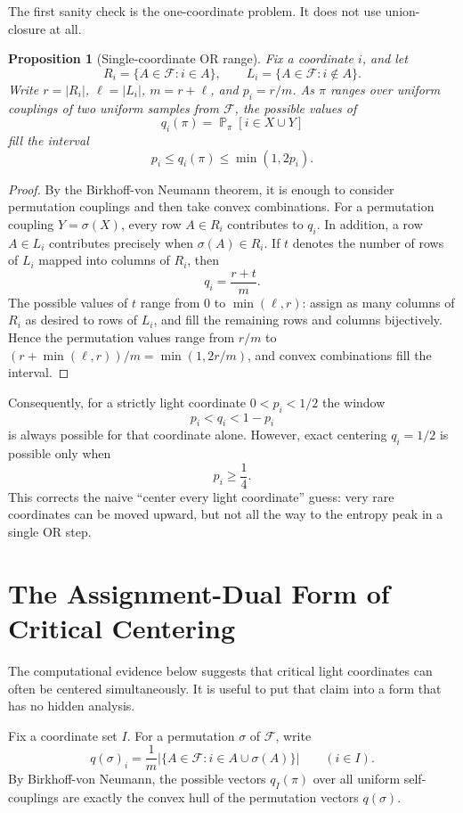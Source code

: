 \documentclass[11pt]{article}
\newtheorem{proposition}{Proposition}
\DeclareMathOperator{\Prb}{\mathbb{P}}
\begin{document}
The first sanity check is the one-coordinate problem.  It does not use
union-closure at all.

\begin{proposition}[Single-coordinate OR range]
Fix a coordinate $i$, and let
\[
  R_i=\{A\in\mathcal{F}:i\in A\},\qquad
  L_i=\{A\in\mathcal{F}:i\notin A\}.
\]
Write $r=|R_i|$, $\ell=|L_i|$, $m=r+\ell$, and $p_i=r/m$.  As $\pi$ ranges
over uniform couplings of two uniform samples from $\mathcal{F}$, the possible
values of
\[
  q_i(\pi)=\Prb_\pi[i\in X\cup Y]
\]
fill the interval
\[
  p_i \le q_i(\pi)\le \min(1,2p_i).
\]
\end{proposition}

\begin{proof}
By the Birkhoff-von Neumann theorem, it is enough to consider permutation
couplings and then take convex combinations.  For a permutation coupling
$Y=\sigma(X)$, every row $A\in R_i$ contributes to $q_i$.  In addition, a row
$A\in L_i$ contributes precisely when $\sigma(A)\in R_i$.  If $t$ denotes the
number of rows of $L_i$ mapped into columns of $R_i$, then
\[
  q_i=\frac{r+t}{m}.
\]
The possible values of $t$ range from $0$ to $\min(\ell,r)$: assign as many
columns of $R_i$ as desired to rows of $L_i$, and fill the remaining rows and
columns bijectively.  Hence the permutation values range from $r/m$ to
$(r+\min(\ell,r))/m=\min(1,2r/m)$, and convex combinations fill the interval.
\end{proof}

Consequently, for a strictly light coordinate $0<p_i<1/2$ the window
\[
  p_i<q_i<1-p_i
\]
is always possible for that coordinate alone.  However, exact centering
$q_i=1/2$ is possible only when
\[
  p_i\ge \frac14.
\]
This corrects the naive ``center every light coordinate'' guess: very rare
coordinates can be moved upward, but not all the way to the entropy peak in a
single OR step.

\section{The Assignment-Dual Form of Critical Centering}

The computational evidence below suggests that critical light coordinates can
often be centered simultaneously.  It is useful to put that claim into a form
that has no hidden analysis.

Fix a coordinate set $I$.  For a permutation $\sigma$ of $\mathcal{F}$, write
\[
  q(\sigma)_i
  =
  \frac1m
  \left|\{A\in\mathcal{F}:i\in A\cup\sigma(A)\}\right|
  \qquad (i\in I).
\]
By Birkhoff-von Neumann, the possible vectors $q_I(\pi)$ over all uniform
self-couplings are exactly the convex hull of the permutation vectors
$q(\sigma)$.
\end{document}
